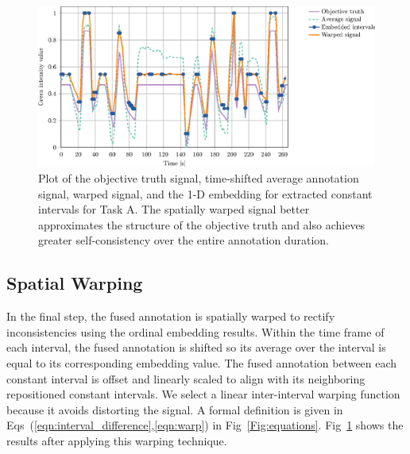 \documentclass[10pt,letterpaper]{article}
\begin{document}
\begin{figure}
    \begin{adjustwidth}{-2.25in}{0in}
	\centering
    \includegraphics{images/Fig6.eps}
    \vspace{0.5em}
	\caption{Plot of the objective truth signal, time-shifted average annotation signal, warped signal, and the 1-D embedding for extracted constant intervals for Task A.  The spatially warped signal better approximates the structure of the objective truth and also achieves greater self-consistency over the entire annotation duration.}
	\label{Fig:warp_evaldep}
	\end{adjustwidth}
\end{figure}

\subsection*{Spatial Warping}

In the final step, the fused annotation is spatially warped to rectify inconsistencies using the ordinal embedding results.  Within the time frame of each interval, the fused annotation is shifted so its average over the interval is equal to its corresponding embedding value.  The fused annotation between each constant interval is offset and linearly scaled to align with its neighboring repositioned constant intervals.  We select a linear inter-interval warping function because it avoids distorting the signal.  A formal definition is given in Eqs~(\ref{eqn:interval_difference},\ref{eqn:warp}) in Fig~\ref{Fig:equations}.  Fig~\ref{Fig:warp_evaldep} shows the results after applying this warping technique.
\end{document}
